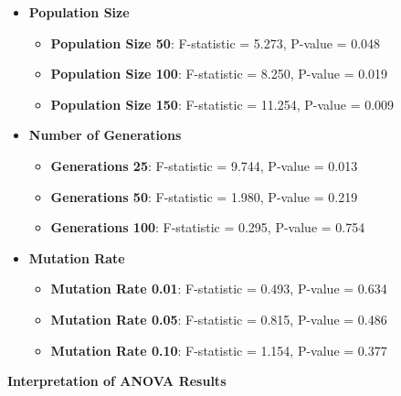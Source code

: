 \documentclass[
]{article}
\begin{document}
    \begin{itemize}
        \item \textbf{Population Size}
        \begin{itemize}
            \item \textbf{Population Size 50}: F-statistic = 5.273, P-value = 0.048
            \item \textbf{Population Size 100}: F-statistic = 8.250, P-value = 0.019
            \item \textbf{Population Size 150}: F-statistic = 11.254, P-value = 0.009
        \end{itemize}
        \item \textbf{Number of Generations}
        \begin{itemize}
            \item \textbf{Generations 25}: F-statistic = 9.744, P-value = 0.013
            \item \textbf{Generations 50}: F-statistic = 1.980, P-value = 0.219
            \item \textbf{Generations 100}: F-statistic = 0.295, P-value = 0.754
        \end{itemize}
        \item \textbf{Mutation Rate}
        \begin{itemize}
            \item \textbf{Mutation Rate 0.01}: F-statistic = 0.493, P-value = 0.634
            \item \textbf{Mutation Rate 0.05}: F-statistic = 0.815, P-value = 0.486
            \item \textbf{Mutation Rate 0.10}: F-statistic = 1.154, P-value = 0.377
        \end{itemize}
    \end{itemize}

    \textbf{Interpretation of ANOVA Results}
\end{document}
